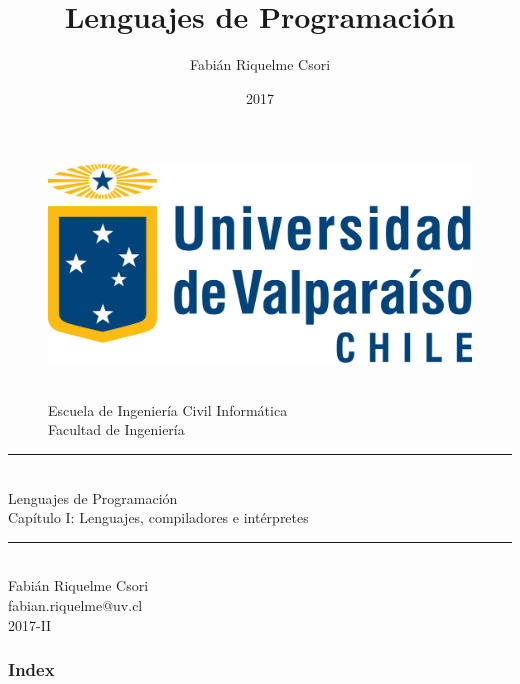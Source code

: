 \documentclass{beamer} %
\title{Lenguajes de Programación}                     %
\author{Fabián Riquelme Csori}                        %
\date{2017}                                           %
\institute{Universidad de Valparaíso}                 %
\newcommand{\HRule}{\rule{\linewidth}{0.2mm}\\[1ex]}
\begin{document}
%

\begin{frame}[plain]
  \begin{figure}[h]
    \begin{minipage}{0.3\textwidth}
    \includegraphics[width=.9\textwidth]{./image/logo-UV.png}
    \end{minipage}
    \begin{minipage}{0.65\textwidth}
     $~$\\[3.6ex]
     \footnotesize{Escuela de Ingeniería Civil Informática}\\
     \footnotesize{Facultad de Ingeniería}
    \end{minipage}
  \end{figure}
  \begin{center}
    \vspace{1ex}
    \HRule
    \Large{Lenguajes de Programación}\\{\small Capítulo I: Lenguajes, compiladores e intérpretes}\\[-1ex]
    \HRule\vspace{1ex}
    \large{Fabián Riquelme Csori}\\[.5ex]\footnotesize{fabian.riquelme@uv.cl}\\[6ex] {\tiny 2017-II}\\[6ex]
  \end{center}
\end{frame}

\begin{frame}
 \frametitle{Index}
 \scriptsize 			%
 \tableofcontents		%
\end{frame}
\end{document}
